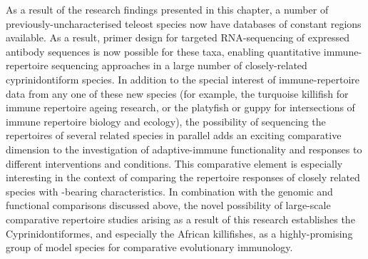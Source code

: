 As a result of the research findings presented in this chapter, a number of previously-uncharacterised teleost species now have databases of constant regions available. As a result, primer design for targeted RNA-sequencing of expressed antibody sequences is now possible for these taxa, enabling quantitative immune-repertoire sequencing approaches in a large number of closely-related cyprinidontiform species. In addition to the special interest of immune-repertoire data from any one of these new species (for example, the turquoise killifish for immune repertoire ageing research, or the platyfish or guppy for intersections of immune repertoire biology and ecology), the possibility of sequencing the repertoires of several related species in parallel adds an exciting comparative dimension to the investigation of adaptive-immune functionality and responses to different interventions and conditions. This comparative element is especially interesting in the context of comparing the repertoire responses of closely related species with -bearing characteristics. In combination with the genomic and functional comparisons discussed above, the novel possibility of large-scale comparative repertoire studies arising as a result of this research establishes the Cyprinidontiformes, and especially the African killifishes, as a highly-promising group of model species for comparative evolutionary immunology.